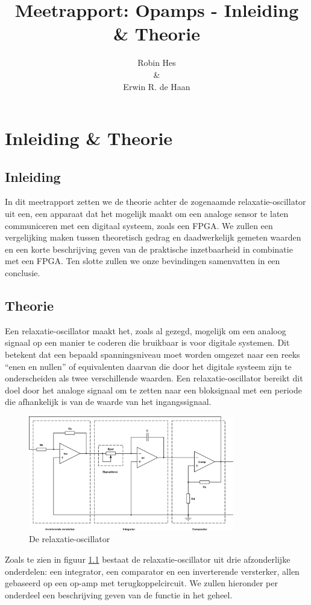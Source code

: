 \documentclass{report}
\title{Meetrapport: Opamps - Inleiding & Theorie}
\author{Robin Hes\\\&\\Erwin R. de Haan}
\begin{document}
\chapter{Inleiding \& Theorie}

\section{Inleiding}
In dit meetrapport zetten we de theorie achter de zogenaamde relaxatie-oscillator uit een, een apparaat dat het mogelijk maakt om een analoge sensor te laten communiceren met een digitaal systeem, zoals een FPGA. We zullen een vergelijking maken tussen theoretisch gedrag en daadwerkelijk gemeten waarden en een korte beschrijving geven van de praktische inzetbaarheid in combinatie met een FPGA. Ten slotte zullen we onze bevindingen samenvatten in een conclusie.

\section{Theorie}
Een relaxatie-oscillator maakt het, zoals al gezegd, mogelijk om een analoog signaal op een manier te coderen die bruikbaar is voor digitale systemen. Dit betekent dat een bepaald spanningsniveau moet worden omgezet naar een reeks ``enen en nullen'' of equivalenten daarvan die door het digitale systeem zijn te onderscheiden als twee verschillende waarden. Een relaxatie-oscillator bereikt dit doel door het analoge signaal om te zetten naar een bloksignaal met een periode die afhankelijk is van de waarde van het ingangssignaal.

\begin{figure}[H]
	\centering
	\includegraphics[width=0.8\textwidth]{relaxatie-oscillator.png}
	\caption{De relaxatie-oscillator}
	\label{fig:rel-os}
\end{figure}

Zoals te zien in figuur \ref{fig:rel-os} bestaat de relaxatie-oscillator uit drie afzonderlijke onderdelen: een integrator, een comparator en een inverterende versterker, allen gebaseerd op een op-amp met terugkoppelcircuit. We zullen hieronder per onderdeel een beschrijving geven van de functie in het geheel.
\end{document}
